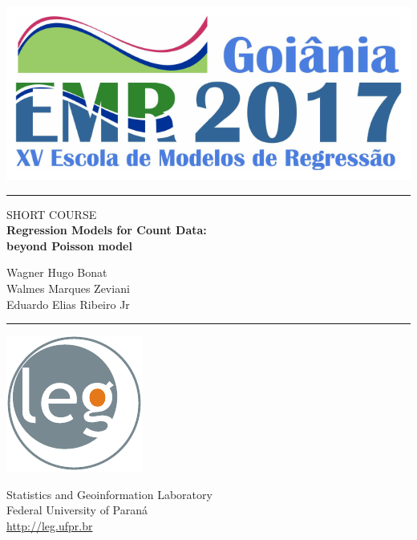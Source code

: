 \documentclass[11pt, a5paper]{book}
\begin{document}
\begin{titlepage}
\thispagestyle{empty}
\centering

\includegraphics[scale=0.7]{./logo-emr}
\vspace*{\fill}

\noindent\rule{\textwidth}{0.4mm}
\vspace*{0.2cm}

{ \LARGE SHORT COURSE\\[0.5cm]

  \textbf{Regression Models for Count Data:\\
  beyond Poisson model}
}

\vspace{1cm}

Wagner Hugo Bonat\\
Walmes Marques Zeviani\\
Eduardo Elias Ribeiro Jr

\vspace*{0.4cm}
\noindent\rule{\textwidth}{0.4mm}

\vspace*{\fill}

\begin{center}
  \begin{minipage}[c]{2.5cm}
    \includegraphics[scale=0.8]{./logo-leg}
  \end{minipage}
  \begin{minipage}[c]{7cm}
    \small
    Statistics and Geoinformation Laboratory\\
    Federal University of Paraná\\
    \url{http://leg.ufpr.br}
  \end{minipage}
\end{center}

\end{titlepage}
\end{document}
